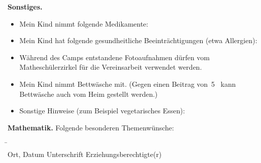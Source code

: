 \documentclass{zettel}
\begin{document}
\begin{shaded}
\textbf{Sonstiges.}
\begin{itemize}
  \item[\checkbox] Mein Kind nimmt folgende Medikamente: \\[1em] \freistLang
  \item[\checkbox] Mein Kind hat folgende gesundheitliche Beeinträchtigungen
  (etwa Allergien): \\[1em] \freistLang
  \item[\checkbox] Während des Camps entstandene Fotoaufnahmen dürfen
  vom Matheschülerzirkel für die Vereinsarbeit verwendet werden.
  \item[\checkbox] Mein Kind nimmt Bettwäsche mit. (Gegen einen Beitrag
  von~5~\texteuro{} kann Bettwäsche auch vom Heim gestellt werden.)
  \item[\checkbox] Sonstige Hinweise (zum Beispiel vegetarisches Essen): \\[1em]
  \freistLang
\end{itemize}
\end{shaded}

\begin{shaded}
\textbf{Mathematik.} Folgende besonderen Themenwünsche:
\freist{6.2cm}
\end{shaded}

\begin{tabbing}
  \freistMittel \qquad\qquad \= \kill
  \freistMittel \> \freistLaenger \\
  Ort, Datum \> Unterschrift Erziehungsberechtigte(r)
\end{tabbing}
\end{document}
